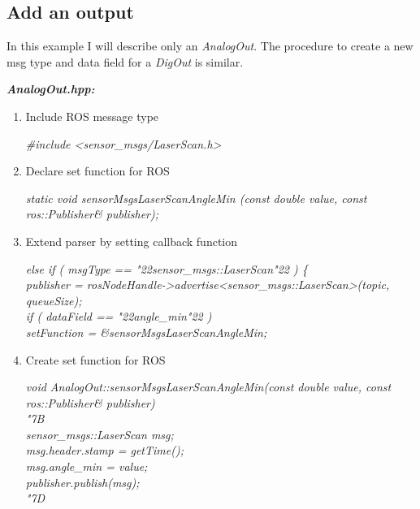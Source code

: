 \subsection{Add an output}
In this example I will describe only an \textit{AnalogOut}.
The procedure to create a new msg type and data field for a \textit{DigOut} is similar.

\textbf{\textit{AnalogOut.hpp:}}
\begin{enumerate}
	\item Include ROS message type
	\begin{snugshade*}
		\textit{\#include <sensor\_msgs/LaserScan.h>}
	\end{snugshade*}
	
	\item Declare set function for ROS
	\begin{snugshade*}
		\textit{static void sensorMsgsLaserScanAngleMin			(const double value, const ros::Publisher\& publisher);}
	\end{snugshade*}
\end{enumerate}

\begin{enumerate}
	\setcounter{enumi}{2}
	\item Extend parser by setting callback function
	\begin{snugshade*}	
		\textit{else if ( msgType == \char"22sensor\_msgs::LaserScan\char"22 ) \{\\
			\-\hspace{1cm}publisher = rosNodeHandle->advertise<sensor\_msgs::LaserScan>(topic, queueSize);\\
			\-\hspace{1cm}if ( dataField == \char"22angle\_min\char"22 )\\
			\-\hspace{2cm}setFunction = \&sensorMsgsLaserScanAngleMin;
			}
	\end{snugshade*}
	
	\item Create set function for ROS
	\begin{snugshade*}
		\textit{void AnalogOut::sensorMsgsLaserScanAngleMin(const double value, const ros::Publisher\& publisher)\\
			\char"7B\\
			\-\hspace{1cm}sensor\_msgs::LaserScan msg;\\
			\-\hspace{1cm}msg.header.stamp = getTime();\\
			\-\hspace{1cm}msg.angle\_min = value;\\
			\-\hspace{1cm}publisher.publish(msg);\\
			\char"7D
		}
	\end{snugshade*}
\end{enumerate}
